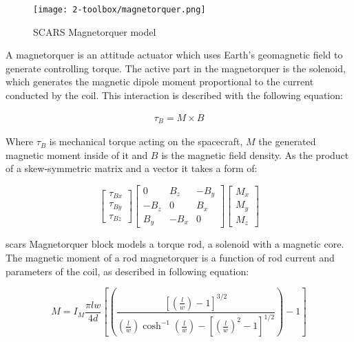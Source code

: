         \begin{figure}[H]
            \centering
            \texttt{[image: 2-toolbox/magnetorquer.png]}
            \caption{SCARS Magnetorquer model}
            \label{fig:reaction_wheels}
        \end{figure}

        A magnetorquer is an attitude actuator which uses Earth's geomagnetic field to generate controlling torque. The active part in the magnetorquer is the solenoid, which generates the magnetic dipole moment proportional to the current conducted by the coil. This interaction is described with the following equation:

        \begin{align}
            \tau_B = M \times B
        \end{align}

        Where $\tau_B$ is mechanical torque acting on the spacecraft, $M$ the generated magnetic moment inside of it and $B$ is the magnetic field density. As the product of a skew-symmetric matrix and a vector it takes a form of:

        \begin{equation}
            \begin{bmatrix}
            \tau_{Bx}\\ 
            \tau_{By}\\ 
            \tau_{Bz}
            \end{bmatrix}
            \begin{bmatrix}
            0 & B_z & -B_y\\ 
            -B_z & 0 & B_x\\ 
            B_y & -B_x & 0
            \end{bmatrix}
            \begin{bmatrix}
            M_x\\
            M_y\\
            M_z
            \end{bmatrix}                
        \end{equation} %

        \ac{scars} Magnetorquer block models a torque rod, a solenoid with a magnetic core. The magnetic moment of a rod magnetorquer is a function of rod current and parameters of the coil, as described in following equation:

        \begin{equation}
            M = I_M\frac{\pi lw}{4d}\left[\left( \frac{\left[ \left( \frac{l}{w} \right) -1\right]^{3/2}}{\left( \frac{l}{w} \right)\cosh^{-1}\left( \frac{l}{w} \right)-\left[\left( \frac{l}{w} \right)^2 -1\right]^{1/2}} \right)- 1 \right]
        \end{equation}

